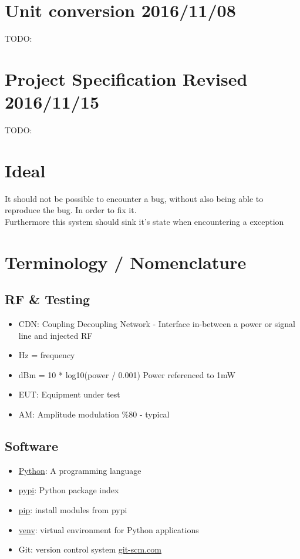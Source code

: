\documentclass[a4paper]{article}
\begin{document}
\section{Unit conversion 2016/11/08}
TODO:

\section{Project Specification Revised 2016/11/15}
TODO:

\section{Ideal}
It should not be possible to encounter a bug, without also being able to reproduce the bug. In order to fix it.\\
Furthermore this system should sink it's state when encountering a exception\\


\newpage

\section{Terminology  /  Nomenclature}


\subsection{RF \& Testing}
\begin{itemize}
\item CDN: Coupling Decoupling Network - Interface in-between a power or signal line and injected RF
\item Hz = frequency
\item dBm = 10 * log10(power / 0.001) Power referenced to 1mW
\item EUT: Equipment under test
\item AM: Amplitude modulation \%80 - typical
\end{itemize}

\subsection{Software}
\begin{itemize}
\item \href{https://www.python.org/}{Python}: A programming language
\item \href{https://pypi.python.org/pypi}{pypi}: Python package index
\item \href{https://pypi.python.org/pypi/pip}{pip}: install modules from pypi
\item \href{https://docs.python.org/3/library/venv.html}{venv}: virtual environment for Python applications
\item Git: version control system \href{https://git-scm.com}{git-scm.com}
\end{itemize}
\end{document}
